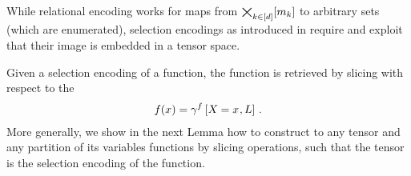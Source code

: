 

While relational encoding works for maps from $\bigtimes_{k\in[d]}[m_{k}]$ to arbitrary sets (which are enumerated), selection encodings as introduced in  require and exploit that their image is embedded in a tensor space.

Given a selection encoding of a function, the function is retrieved by slicing with respect to the
\begin{align*}
    f(x) = \gamma^{f}\left[X_{}=x_{},L\right] \, .
\end{align*}
More generally, we show in the next Lemma how to construct to any tensor and any partition of its variables functions by slicing operations, such that the tensor is the selection encoding of the function.

